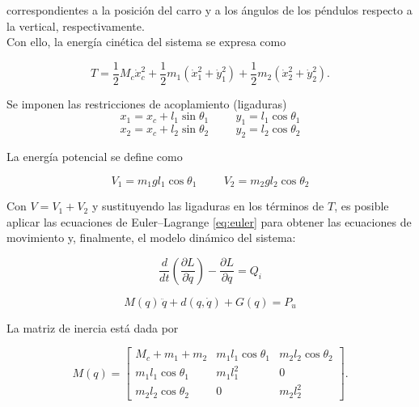 \documentclass[conference]{IEEEtran}
\begin{document}
correspondientes a la posición del carro y a los ángulos de los péndulos respecto a la vertical, respectivamente.\\

Con ello, la energía cinética del sistema se expresa como 

\begin{equation}
	T = \frac{1}{2}M_c \dot{x}_c^2 + \frac{1}{2} m_1(\dot{x}_1^2 + \dot{y}_1^2) + \frac{1}{2} m_2(\dot{x}_2^2 + \dot{y}_2^2).
\end{equation}

Se imponen las restricciones de acoplamiento (ligaduras) 
\begin{equation}
	x_1 = x_c + l_1 \sin{\theta_1} \hspace{1cm} 	y_1= l_1 \cos{\theta_1}
\end{equation}
\begin{equation}
	x_2 = x_c + l_2 \sin{\theta_2} \hspace{1cm} 	y_2= l_2 \cos{\theta_2}
\end{equation}

La energía potencial se define como 

\begin{equation}
V_1 =	m_1 g l_1 \cos{\theta_1} \hspace{1cm} V_2 = m_2 g l_2 \cos{\theta_2}
\end{equation}

Con $V = V_1 + V_2$ y sustituyendo las ligaduras en los términos de $T$, es posible aplicar las ecuaciones de Euler--Lagrange \eqref{eq:euler} para obtener las ecuaciones de movimiento y, finalmente, el modelo dinámico del sistema:

\begin{equation}
	\frac{d}{dt}\left( \frac{\partial L}{\partial \dot{q}} \right) - \frac{\partial L}{\partial q}  = Q_i
	\label{eq:euler}
\end{equation}

\begin{equation}
M(q)\,\ddot{q} + d(q,\dot{q}) + G(q) = P_u
\end{equation}


La matriz de inercia está dada por

\begin{equation}
M(q)=
\begin{bmatrix}
M_c+m_1+m_2 &
m_1 l_1 \cos\theta_1 &
m_2 l_2 \cos\theta_2
\\
m_1 l_1 \cos\theta_1 &
m_1 l_1^2 &
0
\\
m_2 l_2 \cos\theta_2 &
0 &
m_2 l_2^2
\end{bmatrix}.
\end{equation}
\end{document}
